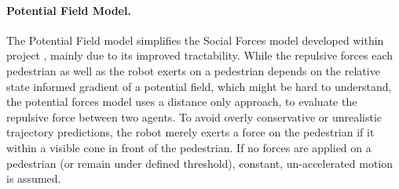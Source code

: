 \paragraph{Potential Field Model.} The Potential Field model simplifies the Social Forces model developed within project \project, mainly due to its improved tractability. While the repulsive forces each pedestrian as well as the robot exerts on a pedestrian depends on the relative state informed gradient of a potential field, which might be hard to understand, the potential forces model uses a distance only approach, to evaluate the repulsive force between two agents. To avoid overly conservative or unrealistic trajectory predictions, the robot merely exerts a force on the pedestrian if it within a visible cone in front of the pedestrian. If no forces are applied on a pedestrian (or remain under defined threshold), constant, un-accelerated motion is assumed.
